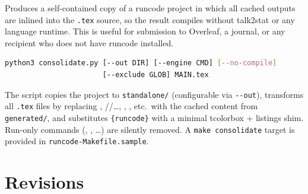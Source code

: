 \documentclass{ltxdoc}
\newcommand{\pkg}[1]{\textsf{#1}}
\newcommand{\file}[1]{\texttt{#1}}
\begin{document}
Produces a self-contained copy of a \pkg{runcode} project in which all
cached outputs are inlined into the \texttt{.tex} source, so the result
compiles without \pkg{talk2stat} or any language runtime.  This is
useful for submission to Overleaf, a journal, or any recipient who does
not have \pkg{runcode} installed.

\begin{lstlisting}[language=bash]
python3 consolidate.py [--out DIR] [--engine CMD] [--no-compile]
                       [--exclude GLOB] MAIN.tex
\end{lstlisting}

The script copies the project to \file{standalone/} (configurable via
\texttt{-{}-out}), transforms all \texttt{.tex} files by replacing
, //\ldots,
, , etc.\ with the cached content from
\file{generated/}, and substitutes \texttt{\{runcode\}}
with a minimal \pkg{tcolorbox} + \pkg{listings} shim.  Run-only
commands (, , \ldots) are silently removed.
A \texttt{make consolidate} target is provided in
\file{runcode-Makefile.sample}.

\section{Revisions}
\label{sec:revisions}
\end{document}
